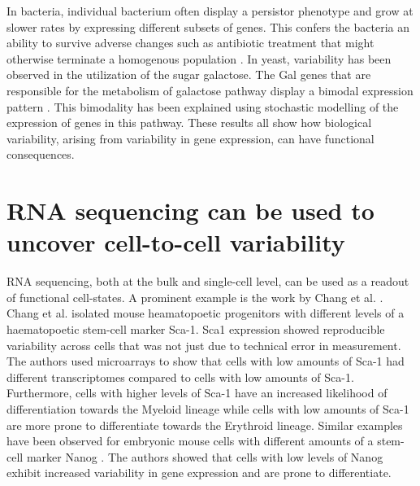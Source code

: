 In bacteria, individual bacterium often display a persistor phenotype and grow at slower rates by expressing different subsets of genes. This confers the bacteria an ability to survive adverse changes such as antibiotic treatment that might otherwise terminate a homogenous population \cite{veening_bet-hedging_2008}. In yeast, variability has been observed in the utilization of the sugar galactose. The Gal genes that are responsible for the metabolism of galactose pathway display a bimodal expression pattern \cite{acar_enhancement_2005}. This bimodality has been explained using stochastic modelling of the expression of genes in this pathway. These results all show how biological variability, arising from variability in gene expression, can have functional consequences. 


\section{RNA sequencing can be used to uncover cell-to-cell variability}

RNA sequencing, both at the bulk and single-cell level, can be used as a readout of functional cell-states. A prominent example is the work by Chang et al. \cite{chang_transcriptome-wide_2008}. Chang et al. isolated mouse heamatopoetic progenitors with different levels of a haematopoetic stem-cell marker Sca-1.  Sca1 expression showed reproducible variability across cells that was not just due to technical error in measurement. The authors used microarrays to show that cells with low amounts of Sca-1 had different transcriptomes compared to cells with low amounts of Sca-1. Furthermore, cells with higher levels of Sca-1 have an increased likelihood of differentiation towards the Myeloid lineage while cells with low amounts of Sca-1 are more prone to differentiate towards the Erythroid lineage. Similar examples have been observed for embryonic mouse cells with different amounts of a stem-cell marker Nanog \cite{kalmar_regulated_2009}. The authors showed that cells with low levels of Nanog exhibit increased variability in gene expression and are prone to differentiate.

